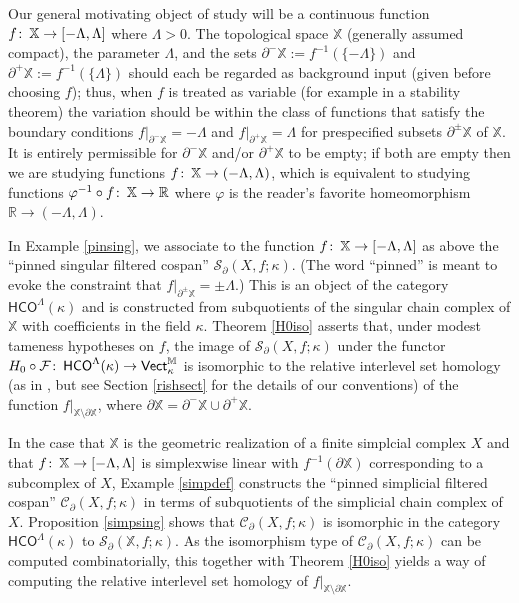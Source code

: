 \documentclass[11pt]{amsart}
\theoremstyle{definition}
\theoremstyle{remark}
\numberwithin{equation}{section}
\def\co{\colon\thinspace}
\def\R{\mathbb{R}}
\begin{document}
Our general motivating object of study will be a continuous function $f\co \mathbb{X}\to [-\Lambda,\Lambda]$ where $\Lambda>0$.   The topological space $\mathbb{X}$ (generally assumed compact), the parameter $\Lambda$, and the sets  $\partial^-\mathbb{X}:=f^{-1}(\{-\Lambda\})$ and $\partial^+\mathbb{X}:=f^{-1}(\{\Lambda\})$  should each be regarded as background input (given before choosing $f$); thus, when $f$ is treated as variable (for example in a stability theorem) the variation should be within the class of functions that satisfy the boundary conditions $f|_{\partial^-\mathbb{X}}= -\Lambda$ and $f|_{\partial^+\mathbb{X}}=\Lambda$ for prespecified subsets $\partial^{\pm}\mathbb{X}$ of $\mathbb{X}$.  It is entirely permissible for $\partial^-\mathbb{X}$ and/or $\partial^+\mathbb{X}$ to be empty; if both are empty then we are studying functions $f\co \mathbb{X}\to (-\Lambda,\Lambda)$, which is equivalent to studying functions $\varphi^{-1}\circ f\co \mathbb{X}\to\R$ where $\varphi$ is the reader's favorite homeomorphism $\R\to (-\Lambda,\Lambda)$.   

In Example \ref{pinsing}, we associate  to the function $f\co \mathbb{X}\to [-\Lambda,\Lambda]$ as above the ``pinned singular filtered cospan'' $\mathcal{S}_{\partial}(X,f;\kappa)$.  (The word ``pinned'' is meant to evoke the constraint that $f|_{\partial^{\pm}\mathbb{X}}=\pm\Lambda$.)	This is an object of the category $\mathsf{HCO}^{\Lambda}(\kappa)$ and is constructed from subquotients of the singular chain complex of $\mathbb{X}$ with coefficients in the field $\kappa$.   Theorem \ref{H0iso} asserts that, under modest tameness hypotheses on $f$, the image of $\mathcal{S}_{\partial}(X,f;\kappa)$ under the functor $H_0\circ\mathcal{F}\co \mathsf{HCO}^{\Lambda}(\kappa)\to \mathsf{Vect}_{\kappa}^{\mathbb{M}}$ is isomorphic to the relative interlevel set homology (as in \cite{BBF20}, but see Section \ref{rishsect} for the details of our conventions) of the function $f|_{\mathbb{X}\setminus\partial\mathbb{X}}$, where $\partial\mathbb{X}=\partial^-\mathbb{X}\cup\partial^+\mathbb{X}$.  

In the case that $\mathbb{X}$ is the geometric realization of a finite simplcial complex $X$ and that $f\co \mathbb{X}\to [-\Lambda,\Lambda]$ is simplexwise linear with $f^{-1}(\partial\mathbb{X})$ corresponding to a subcomplex of $X$, Example \ref{simpdef} constructs the ``pinned simplicial filtered cospan'' $\mathcal{C}_{\partial}(X,f;\kappa)$ in terms of subquotients of the simplicial chain complex of $X$.   Proposition \ref{simpsing} shows that $\mathcal{C}_{\partial}(X,f;\kappa)$ is isomorphic in the category $\mathsf{HCO}^{\Lambda}(\kappa)$ to $\mathcal{S}_{\partial}(\mathbb{X},f;\kappa)$.  As the isomorphism type of $\mathcal{C}_{\partial}(X,f;\kappa)$ can be computed combinatorially, this together with Theorem \ref{H0iso} yields a way of computing the relative interlevel set homology of $f|_{\mathbb{X}\setminus\partial\mathbb{X}}$.
\end{document}
